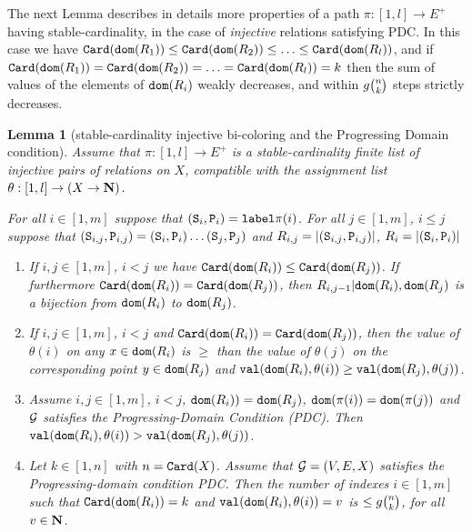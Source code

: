 \documentclass{lmcs}
\newtheorem{lemma}[theorem]{Lemma}
\begin{document}
The next Lemma describes in details more properties of a path
$\pi:[1,l] \rightarrow E^+$ having stable-cardinality, in the case of \emph{injective}
relations satisfying PDC. 
In this case we have ${\tt Card}({\tt dom}(R_{1})) \le {\tt Card}({\tt dom}(R_{2})) \le \ldots \le 
{\tt Card}({\tt dom}(R_{l}))$, and if ${\tt Card}({\tt dom}(R_{1})) = {\tt Card}({\tt dom}(R_{2})) = \ldots = 
{\tt Card}({\tt dom}(R_{l}))=k$ then 
the sum of values of the elements of ${\tt dom}(R_i)$ weakly decreases,
and within $g\newton{n}{k}$ steps strictly decreases.

\begin{lemma}
[stable-cardinality injective bi-coloring and the Progressing Domain condition]
\label{lemma-stable-cardinality-injective}
Assume that 
$\pi:[1,l] \rightarrow E^+$ 
is a \emph{stable-cardinality} finite list
of \emph{injective} pairs of relations on $X$, 
compatible with the assignment list 
$\theta:[1,l] \rightarrow (X \rightarrow {\bf N})$.

For all $i \in[1,m]$ suppose that $({\tt S}_i,{\tt P}_i) = {\tt label}\pi(i)$.
For all $j \in[1,m]$, $i \le j$
suppose that $({\tt S}_{i,j},{\tt P}_{i,j}) = ({\tt S}_i,{\tt P}_i) \ldots ({\tt S}_j,{\tt P}_j)$
and $R_{i,j} = {| ({\tt S}_{i,j},{\tt P}_{i,j}) |}$, 
$R_i = {| ({\tt S}_{i},{\tt P}_{i}) |}$

\begin{enumerate}
\item
\label{lemma-stable-cardinality-injective-01}
If $i,j \in[1,m]$, $i < j$ we have ${\tt Card}({\tt dom}(R_i)) \le {\tt Card}({\tt dom}(R_j))$.
If furthermore ${\tt Card}({\tt dom}(R_i)) = {\tt Card}({\tt dom}(R_j))$,
then $R_{i,j-1} {|} {\tt dom}(R_{i}), {\tt dom}(R_{j})$ is a bijection from ${\tt dom}(R_{i})$
to ${\tt dom}(R_{j})$.

\item
\label{lemma-stable-cardinality-injective-02}
If $i,j \in[1,m]$, $i < j$ and ${\tt Card}({\tt dom}(R_i)) = {\tt Card}({\tt dom}(R_j))$, then 
the value of $\theta(i)$ on any $x \in {\tt dom}(R_i)$ is $\ge$ than the value of
$\theta(j)$ on the corresponding point $y \in {\tt dom}(R_j)$ and
${\tt val}({\tt dom}(R_i),\theta(i)) \ge {\tt val}({\tt dom}(R_j),\theta(j))$.

\item
\label{lemma-stable-cardinality-injective-03}
Assume $i,j \in[1,m]$, $i < j$, ${\tt dom}(R_i)) ={\tt dom}(R_j)$, 
${\tt dom}(\pi(i)) = {\tt dom}(\pi(j)) $ 
and ${\mathcal G}$ satisfies the Progressing-Domain Condition (PDC). Then 
${\tt val}({\tt dom}(R_i),\theta(i)) > {\tt val}({\tt dom}(R_j),\theta(j))$.

\item
\label{lemma-stable-cardinality-injective-04}
Let $k \in [1,n]$
with $n = {\tt Card}(X)$.
Assume that ${\mathcal G}=(V,E,X)$
satisfies the Progressing-domain condition PDC.
Then the number of indexes $i \in[1,m]$ such that ${\tt Card}({\tt dom}(R_i))=k$
and ${\tt val}({\tt dom}(R_i),\theta(i))=v$ is
$\le g\newton{n}{k}$, for all $v \in {\bf N}$.

\end{enumerate}
\end{lemma}
\end{document}
